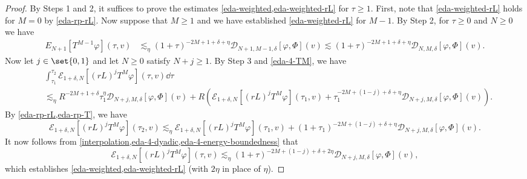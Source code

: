 \documentclass[10pt, reqno]{amsart}
\begin{document}
\begin{proof}
 By
Steps 1 and 2, it suffices to prove the estimates
\cref{eda-weighted,eda-weighted-rL} for \(\tau{}\ge 1\). First, note that
\cref{eda-weighted-rL} holds for \(M = 0\) by \cref{eda-rp-rL}. Now suppose that
\(M\ge 1\) and we have established \cref{eda-weighted-rL} for \(M-1\). By Step 2,
for \(\tau{}\ge 0\) and \(N\ge 0\) we have
\begin{equation}\label{eda-4-TM}
\begin{split}
E_{N+1}[T^{M-1}\varphi{}](\tau{},v)&\lesssim_\eta{} (1+\tau{})^{-2M+1+\delta{}+\eta{}}\mathcal{D}_{N+1,M-1,\delta{}}[\varphi{},\Phi{}](v)\lesssim (1+\tau{})^{-2M+1+\delta{}+\eta{}}\mathcal{D}_{N,M,\delta{}}[\varphi{},\Phi{}](v).
\end{split}
\end{equation}
Now let \(j\in \set{0,1}\) and let \(N\ge 0\) satisfy \(N + j\ge 1\). By Step 3 and \cref{eda-4-TM}, we
have
\begin{equation}\label{eda-4-dyadic}
\begin{split}
&\int_{\tau{}_1}^{\tau{}_2} \mathcal{E}_{1+\delta{},N}[(rL)^jT^M\varphi{}](\tau{},v)\dd{}\tau{}\\
&\lesssim_\eta{} R^{-2M+1+\delta{}}\tau{}_1^\eta{}\mathcal{D}_{N+j,M,\delta{}}[\varphi{},\Phi{}](v) + R(\mathcal{E}_{1+\delta{},N}[(rL)^jT^M\varphi{}](\tau{}_1,v) + \tau{}_1^{-2M+(1-j)+\delta{}+\eta{}}\mathcal{D}_{N+j,M,\delta{}}[\varphi{},\Phi{}](v)).
\end{split}
\end{equation}
By \cref{eda-rp-rL,eda-rp-T}, we have
\begin{equation}\label{eda-4-energy-boundedness}
\mathcal{E}_{1+\delta{},N}[(rL)^jT^M\varphi{}](\tau{}_2,v)\lesssim_\eta{} \mathcal{E}_{1+\delta{},N}[(rL)^jT^M\varphi{}](\tau{}_1,v) + (1+\tau{}_1)^{-2M+(1-j)+\delta{}+\eta{}}\mathcal{D}_{N+j,M,\delta{}}[\varphi{},\Phi{}](v).
\end{equation}
It now follows from \cref{interpolation,eda-4-dyadic,eda-4-energy-boundedness} that
\begin{equation}
\mathcal{E}_{1+\delta{},N}[(rL)^jT^M\varphi{}](\tau{},v)\lesssim_\eta{} (1+\tau{})^{-2M+(1-j)+\delta{}+2\eta{}}\mathcal{D}_{N+j,M,\delta{}}[\varphi{},\Phi{}](v),
\end{equation}
which establishes \cref{eda-weighted,eda-weighted-rL} (with \(2\eta{}\) in place of
\(\eta{}\)).
\end{proof}
\end{document}
